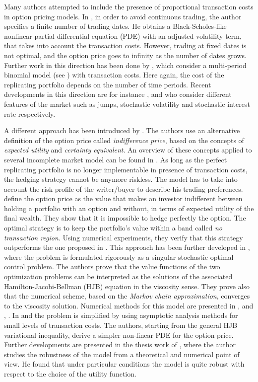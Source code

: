 Many authors attempted to include the presence of proportional transaction costs in option pricing models.
In \cite{Le85}, in order to avoid continuous trading, the author specifies 
a finite number of trading dates. He obtains a Black-Scholes-like
nonlinear partial differential equation (PDE) with an adjusted volatility term, that takes into account the transaction costs. 
However, trading at fixed dates is not optimal, and the option price goes to infinity as the number of dates grows.
Further work in this direction has been done by \cite{BoVo92}, which consider a multi-period binomial model (see \cite{CRR79})
with transaction costs. Here again, the cost of the replicating portfolio depends on the number of time periods. 
Recent developments in this direction are for instance \cite{Mocio07}, \cite{FlMaSe14} and \cite{Sengu14} 
who consider different features of the market such as jumps, stochastic volatility and stochastic interest rate respectively.  

A different approach has been introduced by \cite{HoNe89}. The authors use an alternative definition of the option price
called \emph{indifference price}, based on the concepts of \emph{expected utility} and \emph{certainty equivalent}.  
An overview of these concepts applied to several incomplete market model can be found in \cite{Carmona}.
As long as the perfect replicating portfolio is no longer implementable in presence of transaction costs, the 
hedging strategy cannot be anymore riskless. 
The model has to take into account the risk profile of the writer/buyer to describe his trading preferences.
\cite{HoNe89} define the option price as the value that makes an investor indifferent between holding a portfolio with an option
and without, in terms of expected utility of the final wealth.
They show that it is impossible to hedge perfectly the option. The optimal strategy is to keep the portfolio's value within
a band called \emph{no transaction region}. Using numerical experiments, they verify that this strategy outperforms the one 
proposed in \cite{Le85}.
This approach has been further developed in \cite{DaPaZa93}, where the problem is formulated rigorously as a singular 
stochastic optimal control problem. The authors prove that the value functions of the two optimization problems
can be interpreted as the solutions of the associated Hamilton-Jacobi-Bellman (HJB) equation in the viscosity sense. 
They prove also that the numerical scheme, based on the \emph{Markov chain approximation}, converges to the viscosity solution.
Numerical methods for this model are presented in \cite{DaPa94}, \cite{ClHo97} and \cite{Mon03}, \cite{Mon04}.
In \cite{WhWi97} and \cite{BaSo98} the problem is simplified by using asymptotic analysis methods for small levels of 
transaction costs. The authors, starting from the general HJB variational inequality, derive a simpler non-linear PDE for the option price. 
Further developments are presented in the thesis work of \cite{Damgaard}, where the author 
studies the robustness of the model from a theoretical and numerical point of view. 
He found that under particular conditions the model is quite robust with respect to the choice of the utility function. 


